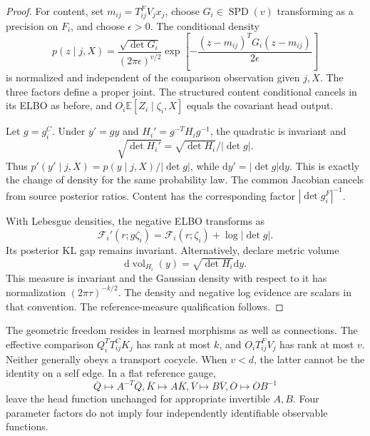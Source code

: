 \documentclass[11pt]{article}
\newcommand{\E}{\mathbb{E}}
\newcommand{\SPD}{\operatorname{SPD}}
\begin{document}
\begin{proof}
For content, set $m_{ij}=T^F_{ij}V_jx_j$, choose $G_i\in\SPD(v)$ transforming as a precision on $F_i$, and choose $\epsilon>0$. The conditional density
\begin{equation}
p(z\mid j,X)=\frac{\sqrt{\det G_i}}{(2\pi\epsilon)^{v/2}}
\exp\left[-\frac{(z-m_{ij})^TG_i(z-m_{ij})}{2\epsilon}\right]
\label{eq:metric-content}
\end{equation}
is normalized and independent of the comparison observation given $j,X$. The three factors define a proper joint. The structured content conditional cancels in its ELBO as before, and $O_i\E[Z_i\mid\zeta_i,X]$ equals the covariant head output.

Let $g=g_i^C$. Under $y'=gy$ and $H_i'=g^{-T}H_ig^{-1}$, the quadratic is invariant and
\begin{equation}
\sqrt{\det H_i'}=\sqrt{\det H_i}/|\det g|.
\end{equation}
Thus $p'(y'\mid j,X)=p(y\mid j,X)/|\det g|$, while $\mathrm{d}y'=|\det g|\mathrm{d}y$. This is exactly the change of density for the same probability law. The common Jacobian cancels from source posterior ratios. Content has the corresponding factor $|\det g_i^F|^{-1}$.

With Lebesgue densities, the negative ELBO transforms as
\begin{equation}
\mathcal F_i'(r;g\zeta_i)=\mathcal F_i(r;\zeta_i)+\log|\det g|.
\label{eq:elbo-jacobian}
\end{equation}
Its posterior KL gap remains invariant. Alternatively, declare metric volume
\begin{equation}
\mathrm{d}\operatorname{vol}_{H_i}(y)=\sqrt{\det H_i}\mathrm{d}y.
\label{eq:metric-volume}
\end{equation}
This measure is invariant and the Gaussian density with respect to it has normalization $(2\pi\tau)^{-k/2}$. The density and negative log evidence are scalars in that convention. The reference-measure qualification follows.
\end{proof}

The geometric freedom resides in learned morphisms as well as connections. The effective comparison $Q_i^TT^C_{ij}K_j$ has rank at most $k$, and $O_iT^F_{ij}V_j$ has rank at most $v$. Neither generally obeys a transport cocycle. When $v<d$, the latter cannot be the identity on a self edge. In a flat reference gauge,
\begin{equation}
\overline Q\mapsto A^{-T}\overline Q,
\overline K\mapsto A\overline K,
\overline V\mapsto B\overline V,
\overline O\mapsto\overline OB^{-1}
\end{equation}
leave the head function unchanged for appropriate invertible $A,B$. Four parameter factors do not imply four independently identifiable observable functions.
\end{document}
